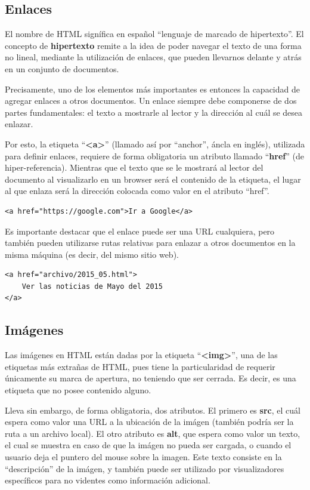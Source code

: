 \subsection*{Enlaces}

El nombre de HTML signífica en español ``lenguaje de marcado de hipertexto''. El
concepto de \textbf{hipertexto} remite a la idea de poder navegar el texto de
una forma no lineal, mediante la utilización de enlaces, que pueden llevarnos
delante y atrás en un conjunto de documentos.

Precisamente, uno de los elementos más importantes es entonces la capacidad de
agregar enlaces a otros documentos. Un enlace siempre debe componerse de dos partes
fundamentales: el texto a mostrarle al lector y la dirección al cuál se desea enlazar.

Por esto, la etiqueta ``\textbf{<a>}'' (llamado así por ``anchor'', áncla en
inglés), utilizada para definir enlaces, requiere de forma obligatoria un
atributo llamado ``\textbf{href}'' (de hiper-referencia). Mientras que el texto
que se le mostrará al lector del documento al visualizarlo en un browser será
el contenido de la etiqueta, el lugar al que enlaza será la dirección
colocada como valor en el atributo ``href''.

\begin{lstlisting}[language=XHTML]
<a href="https://google.com">Ir a Google</a>
\end{lstlisting}

Es importante destacar que el enlace puede ser una URL cualquiera, pero también
pueden utilizarse rutas relativas para enlazar a otros documentos en la misma
máquina (es decir, del mismo sitio web).

\begin{lstlisting}[language=XHTML]
<a href="archivo/2015_05.html">
    Ver las noticias de Mayo del 2015
</a>
\end{lstlisting}

\subsection*{Imágenes}

Las imágenes en HTML están dadas por la etiqueta ``\textbf{<img>}'',
una de las etiquetas más extrañas de HTML, pues tiene la particularidad de
requerir únicamente su marca de apertura, no teniendo que ser cerrada. Es
decir, es una etiqueta que no posee contenido alguno.

Lleva sin embargo, de forma obligatoria, dos atributos. El primero es
\textbf{src}, el cuál espera como valor una URL a la ubicación de la imágen
(también podría ser la ruta a un archivo local). El otro atributo es \textbf{alt},
que espera como valor un texto, el cual se muestra en caso de que la imágen no
pueda ser cargada, o cuando el usuario deja el puntero del mouse sobre la imagen.
Este texto consiste en la ``descripción'' de la imágen, y también puede ser utilizado
por visualizadores específicos para no videntes como información adicional.

